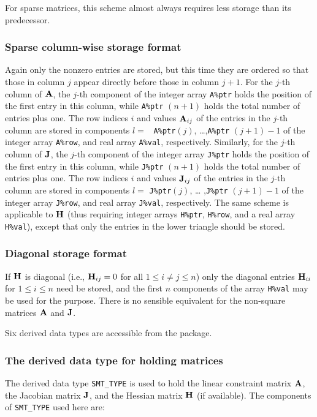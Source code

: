 \documentclass{galahad}
\begin{document}
For sparse matrices, this scheme almost always requires less storage than
its predecessor.

\subsubsection{Sparse column-wise storage format}\label{columnwise}
Again only the nonzero entries are stored, but this time they are
ordered so that those in column $j$ appear directly before those in
column $j+1$. For the $j$-th column of ${\mathbf{A}}$, the $j$-th component of
the integer array {\tt A\%ptr} holds the position of the first entry in
this column, while {\tt A\%ptr} $(n+1)$ holds the total number of
entries plus one.  The row indices $i$ and values ${\mathbf{A}}_{ij}$ of the
entries in the $j$-th column are stored in components $l =$ {\tt
  A\%ptr}$(j)$, \ldots ,{\tt A\%ptr} $(j+1)-1$ of the integer array
{\tt A\%row}, and real array {\tt A\%val}, respectively.  Similarly,
for the $j$-th column of ${\mathbf{J}}$, the $j$-th component of the integer array
{\tt J\%ptr} holds the position of the first entry in this column,
while {\tt J\%ptr} $(n+1)$ holds the total number of entries plus one.
The row indices $i$ and values ${\mathbf{J}}_{ij}$ of the entries in the
$j$-th column are stored in components $l =$ {\tt J\%ptr}$(j)$, \ldots
,{\tt J\%ptr} $(j+1)-1$ of the integer array {\tt J\%row}, and real
array {\tt J\%val}, respectively.  The same scheme is applicable to
${\mathbf{H}}$ (thus requiring integer arrays {\tt H\%ptr}, {\tt H\%row}, and
a real array {\tt H\%val}), except that only the entries in the lower
triangle should be stored.

\subsubsection{Diagonal storage format}\label{diagonal}
If ${\mathbf{H}}$ is diagonal (i.e., ${\mathbf{H}}_{ij} = 0$ for all $1 \leq i \neq j \leq n$)
only the diagonal entries ${\mathbf{H}}_{ii}$ for $1 \leq i \leq n$ need be stored,
and the first $n$ components of the array {\tt H\%val} may be used for
the purpose. There is no sensible equivalent for the non-square
matrices ${\mathbf{A}}$ and ${\mathbf{J}}$.


\galtypes
Six derived data types are accessible from the package.


\subsubsection{The derived data type for holding matrices}\label{typesmt}
The derived data type {\tt SMT\_TYPE} is used to hold the linear
constraint matrix ${\mathbf{A}}$, the Jacobian matrix ${\mathbf{J}}$, and the Hessian
matrix ${\mathbf{H}}$ (if available). The components of {\tt SMT\_TYPE}
used here are:
\end{document}
